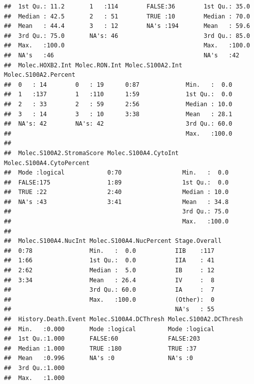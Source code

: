 \documentclass{article}\usepackage[]{graphicx}\usepackage[]{color}
\makeatletter
\newenvironment{kframe}{%
 \def\at@end@of@kframe{}%
 \ifinner\ifhmode%
  \def\at@end@of@kframe{\end{minipage}}%
  \begin{minipage}{\columnwidth}%
 \fi\fi%
 \def\FrameCommand##1{\hskip\@totalleftmargin \hskip-\fboxsep
 \colorbox{shadecolor}{##1}\hskip-\fboxsep
     \hskip-\linewidth \hskip-\@totalleftmargin \hskip\columnwidth}%
 \MakeFramed {\advance\hsize-\width
   \@totalleftmargin\z@ \linewidth\hsize
   \@setminipage}}%
 {\par\unskip\endMakeFramed%
 \at@end@of@kframe}
\newenvironment{knitrout}{}{} %
\makeatother
\begin{document}
\begin{knitrout}
\begin{kframe}
\begin{verbatim}
##  1st Qu.: 11.2       1   :114        FALSE:36        1st Qu.: 35.0      
##  Median : 42.5       2   : 51        TRUE :10        Median : 70.0      
##  Mean   : 44.4       3   : 12        NA's :194       Mean   : 59.6      
##  3rd Qu.: 75.0       NA's: 46                        3rd Qu.: 85.0      
##  Max.   :100.0                                       Max.   :100.0      
##  NA's   :46                                          NA's   :42         
##  Molec.HOXB2.Int Molec.RON.Int Molec.S100A2.Int Molec.S100A2.Percent
##  0   : 14        0   : 19      0:87             Min.   :  0.0       
##  1   :137        1   :110      1:59             1st Qu.:  0.0       
##  2   : 33        2   : 59      2:56             Median : 10.0       
##  3   : 14        3   : 10      3:38             Mean   : 28.1       
##  NA's: 42        NA's: 42                       3rd Qu.: 60.0       
##                                                 Max.   :100.0       
##                                                                     
##  Molec.S100A2.StromaScore Molec.S100A4.CytoInt Molec.S100A4.CytoPercent
##  Mode :logical            0:70                 Min.   :  0.0           
##  FALSE:175                1:89                 1st Qu.:  0.0           
##  TRUE :22                 2:40                 Median : 10.0           
##  NA's :43                 3:41                 Mean   : 34.8           
##                                                3rd Qu.: 75.0           
##                                                Max.   :100.0           
##                                                                        
##  Molec.S100A4.NucInt Molec.S100A4.NucPercent Stage.Overall
##  0:78                Min.   :  0.0           IIB    :117  
##  1:66                1st Qu.:  0.0           IIA    : 41  
##  2:62                Median :  5.0           IB     : 12  
##  3:34                Mean   : 26.4           IV     :  8  
##                      3rd Qu.: 60.0           IA     :  7  
##                      Max.   :100.0           (Other):  0  
##                                              NA's   : 55  
##  History.Death.Event Molec.S100A4.DCThresh Molec.S100A2.DCThresh
##  Min.   :0.000       Mode :logical         Mode :logical        
##  1st Qu.:1.000       FALSE:60              FALSE:203            
##  Median :1.000       TRUE :180             TRUE :37             
##  Mean   :0.996       NA's :0               NA's :0              
##  3rd Qu.:1.000                                                  
##  Max.   :1.000                                                  

\end{verbatim}
\end{kframe}
\end{knitrout}
\end{document}
